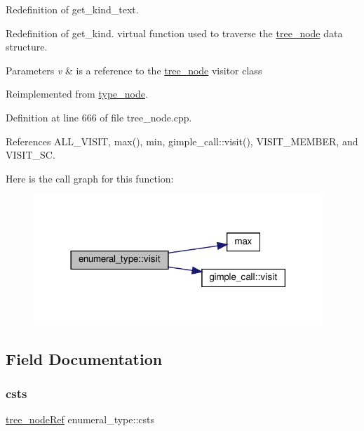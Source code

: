 Redefinition of get\+\_\+kind\+\_\+text. 

Redefinition of get\+\_\+kind. virtual function used to traverse the \hyperlink{classtree__node}{tree\+\_\+node} data structure. 
\begin{DoxyParams}{Parameters}
{\em v} & is a reference to the \hyperlink{classtree__node}{tree\+\_\+node} visitor class \\
\hline
\end{DoxyParams}


Reimplemented from \hyperlink{structtype__node_adc6e447af5f9505e6305320933c46a96}{type\+\_\+node}.



Definition at line 666 of file tree\+\_\+node.\+cpp.



References A\+L\+L\+\_\+\+V\+I\+S\+IT, max(), min, gimple\+\_\+call\+::visit(), V\+I\+S\+I\+T\+\_\+\+M\+E\+M\+B\+ER, and V\+I\+S\+I\+T\+\_\+\+SC.

Here is the call graph for this function\+:
\nopagebreak
\begin{figure}[H]
\begin{center}
\leavevmode
\includegraphics[width=309pt]{d9/d1c/structenumeral__type_ab9c53d590b11d386a0791a0b211a5b1f_cgraph}
\end{center}
\end{figure}


\subsection{Field Documentation}
\mbox{\label{structenumeral__type_a22fd7cd71fe2a66f8c4d5c5623234ae0}} 
\subsubsection{\texorpdfstring{csts}{csts}}
{\footnotesize\ttfamily \hyperlink{tree__node_8hpp_a6ee377554d1c4871ad66a337eaa67fd5}{tree\+\_\+node\+Ref} enumeral\+\_\+type\+::csts}



